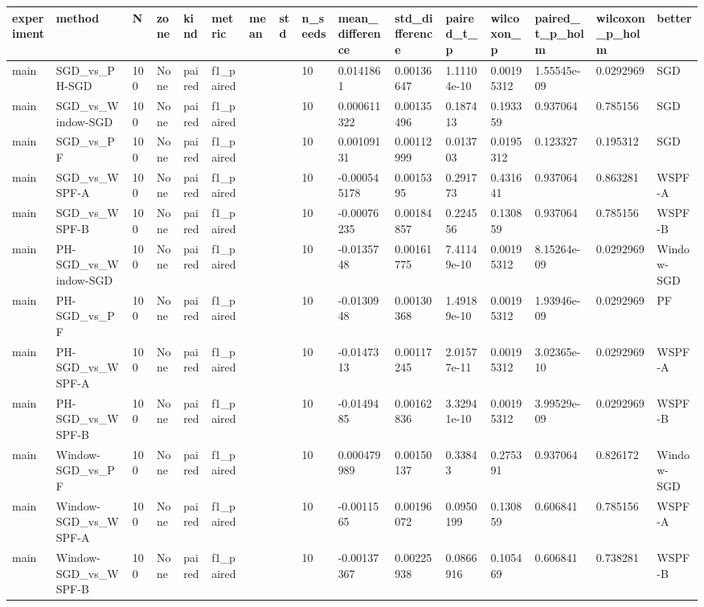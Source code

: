 \begin{tabular}{llllllllllllllll}
\hline
experiment & method & N & zone & kind & metric & mean & std & n\_seeds & mean\_difference & std\_difference & paired\_t\_p & wilcoxon\_p & paired\_t\_p\_holm & wilcoxon\_p\_holm & better \\
\hline
main & SGD\_vs\_PH-SGD & 100 & None & paired & f1\_paired &  &  & 10 & 0.0141861 & 0.00136647 & 1.11104e-10 & 0.00195312 & 1.55545e-09 & 0.0292969 & SGD \\
main & SGD\_vs\_Window-SGD & 100 & None & paired & f1\_paired &  &  & 10 & 0.000611322 & 0.00135496 & 0.187413 & 0.193359 & 0.937064 & 0.785156 & SGD \\
main & SGD\_vs\_PF & 100 & None & paired & f1\_paired &  &  & 10 & 0.00109131 & 0.00112999 & 0.013703 & 0.0195312 & 0.123327 & 0.195312 & SGD \\
main & SGD\_vs\_WSPF-A & 100 & None & paired & f1\_paired &  &  & 10 & -0.000545178 & 0.0015395 & 0.291773 & 0.431641 & 0.937064 & 0.863281 & WSPF-A \\
main & SGD\_vs\_WSPF-B & 100 & None & paired & f1\_paired &  &  & 10 & -0.00076235 & 0.00184857 & 0.224556 & 0.130859 & 0.937064 & 0.785156 & WSPF-B \\
main & PH-SGD\_vs\_Window-SGD & 100 & None & paired & f1\_paired &  &  & 10 & -0.0135748 & 0.00161775 & 7.41149e-10 & 0.00195312 & 8.15264e-09 & 0.0292969 & Window-SGD \\
main & PH-SGD\_vs\_PF & 100 & None & paired & f1\_paired &  &  & 10 & -0.0130948 & 0.00130368 & 1.49189e-10 & 0.00195312 & 1.93946e-09 & 0.0292969 & PF \\
main & PH-SGD\_vs\_WSPF-A & 100 & None & paired & f1\_paired &  &  & 10 & -0.0147313 & 0.00117245 & 2.01577e-11 & 0.00195312 & 3.02365e-10 & 0.0292969 & WSPF-A \\
main & PH-SGD\_vs\_WSPF-B & 100 & None & paired & f1\_paired &  &  & 10 & -0.0149485 & 0.00162836 & 3.32941e-10 & 0.00195312 & 3.99529e-09 & 0.0292969 & WSPF-B \\
main & Window-SGD\_vs\_PF & 100 & None & paired & f1\_paired &  &  & 10 & 0.000479989 & 0.00150137 & 0.33843 & 0.275391 & 0.937064 & 0.826172 & Window-SGD \\
main & Window-SGD\_vs\_WSPF-A & 100 & None & paired & f1\_paired &  &  & 10 & -0.0011565 & 0.00196072 & 0.0950199 & 0.130859 & 0.606841 & 0.785156 & WSPF-A \\
main & Window-SGD\_vs\_WSPF-B & 100 & None & paired & f1\_paired &  &  & 10 & -0.00137367 & 0.00225938 & 0.0866916 & 0.105469 & 0.606841 & 0.738281 & WSPF-B \\

\end{tabular}
